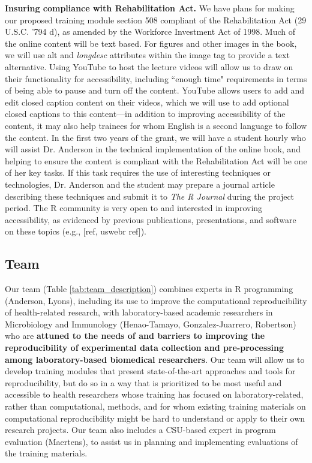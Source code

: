 \documentclass[pdftex,english,11pt,parskip=half]{scrartcl}
\begin{document}
\noindent \textbf{Insuring compliance with Rehabilitation Act.} We have plans
for making our proposed training module section 508 compliant of the
Rehabilitation Act (29 U.S.C. '794 d), as amended by the Workforce Investment
Act of 1998. Much of the online content will be text based. For figures and
other images in the book, we will use alt and \textit{longdesc} attributes
within the image tag to provide a text alternative. Using YouTube to host the
lecture videos will allow us to draw on their functionality for accessibility,
including ``enough time" requirements in terms of being able to pause and turn
off the content. YouTube allows users to add and edit closed caption content on
their videos, which we will use to add optional closed captions to this
content---in addition to improving accessibility of the content, it may also
help trainees for whom English is a second language to follow the content. In
the first two years of the grant, we will have a student hourly who will assist
Dr. Anderson in the technical implementation of the online book, and helping to
ensure the content is compliant with the Rehabilitation Act will be one of her
key tasks. If this task requires the use of interesting techniques or
technologies, Dr. Anderson and the student may prepare a journal article
describing these techniques and submit it to \textit{The R Journal} during the
project period. The R community is very open to and interested in improving
accessibility, as evidenced by previous publications, presentations, and
software on these topics (e.g., [ref, uswebr ref]).

\subsection{Team}



Our team (Table \ref{tab:team_description}) combines experts in R programming (Anderson, Lyons), including its use
to improve the computational reproducibility of health-related research, with
laboratory-based academic researchers in Microbiology and Immunology
(Henao-Tamayo, Gonzalez-Juarrero, Robertson) who are \textbf{attuned to the
needs of and barriers to improving the reproducibility of experimental data
collection and pre-processing among laboratory-based biomedical researchers}.
Our team will allow us to develop training modules that present state-of-the-art
approaches and tools for reproducibility, but do so in a way that is prioritized
to be most useful and accessible to health researchers whose training has
focused on laboratory-related, rather than computational, methods, and for whom
existing training materials on computational reproducibility might be hard to
understand or apply to their own research projects. Our team also includes a
CSU-based expert in program evaluation (Maertens), to assist us in planning and
implementing evaluations of the training materials.
\end{document}
